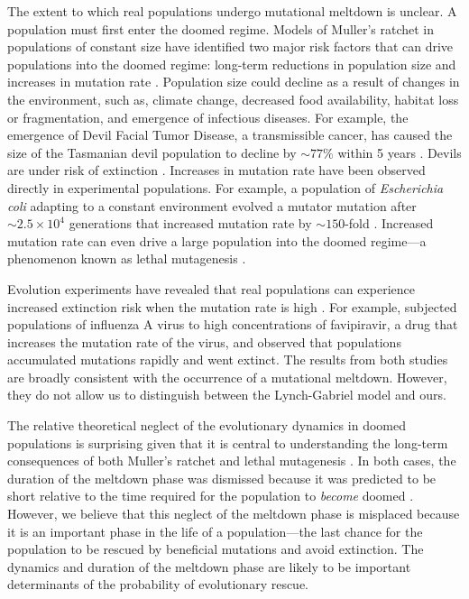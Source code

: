 \documentclass[9pt,lineno]{elife}
\begin{document}
The extent to which real populations undergo mutational meltdown is unclear.  A population must first enter the doomed regime.  Models of Muller's ratchet in populations of constant size
have identified two major risk factors that can drive populations into the doomed regime: long-term reductions in population size and increases in mutation rate   \citep{Lynch_MUTATION_1990, lyn93, Gabriel_MULLER_1993, lyn95}.  Population size could decline as a result of changes in the environment, such as, climate change, decreased food availability, habitat loss or fragmentation, and emergence of infectious diseases.  
For example, the emergence of Devil Facial Tumor Disease, a transmissible cancer, has caused the size of the Tasmanian devil population to decline by $\sim 77\%$ within 5 years \citep{haw06, laz18}.  Devils are under risk of extinction \citep{mcc09}. 
Increases in mutation rate have been observed directly in experimental populations.  For example, a population of \emph{Escherichia coli} adapting to a constant environment evolved a mutator mutation after $\sim 2.5 \times 10^4$  generations that increased mutation rate by $\sim 150$-fold \citep{bar09, wie13}.
Increased mutation rate can even drive a large population into the doomed regime---a phenomenon known as lethal mutagenesis \citep{Bull_Theory_2007}.

Evolution experiments have revealed that real populations can experience  increased extinction risk when the mutation rate is high \citep{zey01a, ban16}.  
For example, \citet{ban16} subjected populations of influenza A virus to high concentrations of favipiravir, a drug that increases the mutation rate of the virus, and observed that populations accumulated mutations rapidly and went extinct. 
The results from both studies are broadly consistent with the occurrence of a mutational meltdown.  However, they do not allow us to distinguish between the Lynch-Gabriel model and ours.

The relative theoretical neglect of the evolutionary dynamics in doomed populations is surprising given that it is central to understanding the long-term consequences of both Muller's ratchet \citep{Lynch_MUTATION_1990,lyn93,Gabriel_MULLER_1993,lyn95} and lethal mutagenesis \citep{Bull_Theory_2007, mat17}.  
%
In both cases, the duration of the meltdown phase was dismissed because it was predicted to be short relative to the time required for the population to \textit{become} doomed \citep{lyn93,lyn95,Bull_Theory_2007}.
%
However, we believe that this neglect of the meltdown phase is misplaced because it
is an important phase in the life of a population---the last chance for the population to be rescued by beneficial mutations and avoid extinction.  The dynamics and duration of the meltdown phase are likely to be important determinants of the probability of evolutionary rescue.
\end{document}
